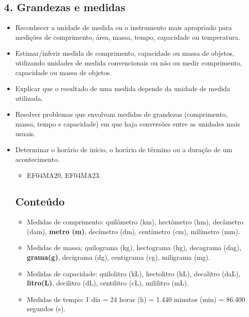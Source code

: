 \begin{enumerate}
\begin{escolha}
\begin{enumerate}
\section{4. Grandezas e medidas}\label{muxf3dulo-4}


\begin{itemize}
\item Reconhecer a unidade de medida ou o instrumento mais apropriado para
medições de comprimento, área, massa, tempo, capacidade ou temperatura.
\item Estimar/inferir medida de comprimento, capacidade ou massa de objetos,
utilizando unidades de medida convencionais ou não ou medir comprimento,
capacidade ou massa de objetos.
\item Explicar que o resultado de uma medida depende da unidade de medida
utilizada.
\item Resolver problemas que envolvam medidas de grandezas (comprimento,
massa, tempo e capacidade) em que haja conversões entre as unidades mais
usuais.
\item Determinar o horário de início, o horário de término ou a duração de
um acontecimento.


\begin{itemize}
\item EF04MA20, EF04MA23.
\end{itemize}

\subsection{Conteúdo}\label{conteuxfado-3}

\begin{itemize}
  \item Medidas de comprimento:
  quilômetro (km), hectômetro (hm), decâmetro (dam), \textbf{metro (m)}, decímetro (dm), centímetro (cm), milímetro (mm).
  \item Medidas de massa:
  quilograma (kg), hectograma (hg), decagrama (dag), \textbf{grama(g)}, decigrama (dg), centigrama (cg), miligrama (mg).
  \item Medidas de capacidade:
  quilolitro (kL), hectolitro (hL), decalitro (daL), \textbf{litro(L)}, decilitro (dL), centilitro (cL), mililitro (mL).
  \item Medidas de tempo:
  1 dia = 24 horas (h) = 1.440 minutos (min) = 86.400 segundos (s).


\end{itemize}
\end{itemize}
\end{enumerate}
\end{escolha}
\end{enumerate}
